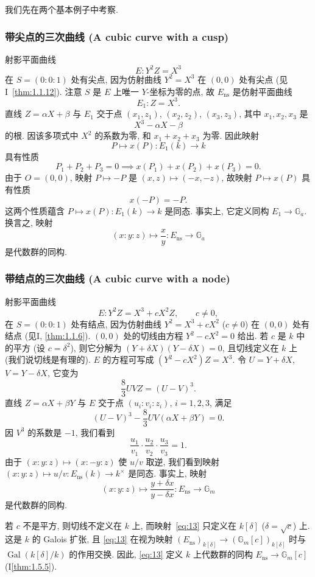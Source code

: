 我们先在两个基本例子中考察.

\subsubsection{带尖点的三次曲线 (A cubic curve with a cusp)}
射影平面曲线
\[
E\colon Y^2Z = X^3
\]
在 $S = (0:0:1)$ 处有尖点, 因为仿射曲线 $Y^2 = X^3$ 在 $(0,0)$ 处有尖点 (见I~\ref{thm:1.1.12}). 注意 $S$ 是 $E$ 上唯一 $Y$-坐标为零的点, 故 $E_{\mathrm{ns}}$ 是仿射平面曲线
\[
E_1\colon Z = X^3.
\]
直线 $Z = \alpha X + \beta$ 与 $E_1$ 交于点 $(x_1, z_1)$, $(x_2, z_2)$, $(x_3, z_3)$, 其中 $x_1, x_2, x_3$ 是
\[
X^3 - \alpha X - \beta
\]
的根. 因该多项式中 $X^2$ 的系数为零, 和 $x_1 + x_2 + x_3$ 为零. 因此映射
\[
P\mapsto x(P)\colon E_1(k)\to k
\]
具有性质
\[
P_1 + P_2 + P_3 = 0 \implies x(P_1) + x(P_2) + x(P_3) = 0.
\]
由于 $O = (0,0)$, 映射 $P\mapsto-P$ 是 $(x,z)\mapsto(-x,-z)$, 故映射 $P\mapsto x(P)$ 具有性质
\[
x(-P) = -P.
\]
这两个性质蕴含 $P\mapsto x(P)\colon E_1(k)\to k$ 是同态. 事实上, 它定义同构 $E_1\to\mathbb{G}_a$. 换言之, 映射
\[
(x:y:z)\mapsto\frac{x}{y}\colon E_{\mathrm{ns}}\to\mathbb{G}_a
\]
是代数群的同构.

\subsubsection{带结点的三次曲线 (A cubic curve with a node)}
射影平面曲线
\[
E\colon Y^2Z = X^3 + cX^2Z, \qquad c\neq 0,
\]
在 $S = (0:0:1)$ 处有结点, 因为仿射曲线 $Y^2 = X^3 + cX^2$ ($c\neq 0$) 在 $(0,0)$ 处有结点 (见I, \ref{thm:1.1.6}). $(0,0)$ 处的切线由方程 $Y^2 - cX^2 = 0$ 给出. 若 $c$ 是 $k$ 中的平方 (设 $c = \delta^2$), 则它分解为 $(Y+\delta X)(Y-\delta X) = 0$, 且切线定义在 $k$ 上 (我们说切线是有理的). $E$ 的方程可写成 $(Y^2 - cX^2)Z = X^3$. 令 $U = Y + \delta X$, $V = Y - \delta X$, 它变为
\[
\frac{8}{3}UVZ = (U - V)^3.
\]
直线 $Z = \alpha X + \beta Y$ 与 $E$ 交于点 $(u_i:v_i:z_i)$, $i = 1,2,3$, 满足
\[
(U - V)^3 - \frac{8}{3}UV(\alpha X + \beta Y) = 0.
\]
因 $V^3$ 的系数是 $-1$, 我们看到
\[
\frac{u_1}{v_1}\cdot\frac{u_2}{v_2}\cdot\frac{u_3}{v_3} = 1.
\]
由于 $(x:y:z)\mapsto(x:-y:z)$ 使 $u/v$ 取逆, 我们看到映射 $(x:y:z)\mapsto u/v\colon E_{\mathrm{ns}}(k)\to k^{\times}$ 是同态. 事实上, 映射
\begin{equation} \label{eq:13}
(x:y:z)\mapsto\frac{y + \delta x}{y - \delta x}\colon E_{\mathrm{ns}}\to\mathbb{G}_m
\tag{13}
\end{equation}
是代数群的同构.

若 $c$ 不是平方, 则切线不定义在 $k$ 上, 而映射~\eqref{eq:13} 只定义在 $k[\delta]$ ($\delta = \sqrt{c}$) 上. 这是 $k$ 的 Galois 扩张, 且 \eqref{eq:13} 在视为映射 $(E_{\mathrm{ns}})_{k[\delta]}\to(\mathbb{G}_m[c])_{k[\delta]}$ 时与 $\operatorname{Gal}(k[\delta]/k)$ 的作用交换. 因此, \eqref{eq:13} 定义 $k$ 上代数群的同构 $E_{\mathrm{ns}}\to\mathbb{G}_m[c]$ (I\ref{thm:1.5.5}).

